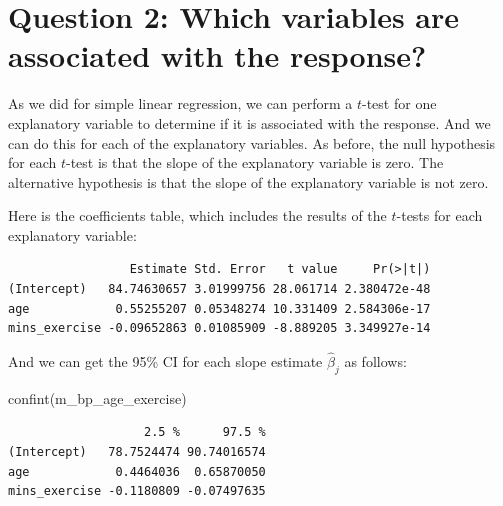 \documentclass[
  letterpaper,
  8pt,
  a4paper]{book}
\newenvironment{Shaded}{\begin{snugshade}}{\end{snugshade}}
\newcommand{\FunctionTok}[1]{\textcolor[rgb]{0.28,0.35,0.67}{#1}}
\newcommand{\NormalTok}[1]{\textcolor[rgb]{0.00,0.23,0.31}{#1}}
\newcommand{\SpecialCharTok}[1]{\textcolor[rgb]{0.37,0.37,0.37}{#1}}
\begin{document}
\section*{Question 2: Which variables are associated with the
response?}\label{question-2-which-variables-are-associated-with-the-response}


As we did for simple linear regression, we can perform a \(t\)-test for
one explanatory variable to determine if it is associated with the
response. And we can do this for each of the explanatory variables. As
before, the null hypothesis for each \(t\)-test is that the slope of the
explanatory variable is zero. The alternative hypothesis is that the
slope of the explanatory variable is not zero.

Here is the coefficients table, which includes the results of the
\(t\)-tests for each explanatory variable:

\begin{Shaded}
\end{Shaded}

\begin{verbatim}
                 Estimate Std. Error   t value     Pr(>|t|)
(Intercept)   84.74630657 3.01999756 28.061714 2.380472e-48
age            0.55255207 0.05348274 10.331409 2.584306e-17
mins_exercise -0.09652863 0.01085909 -8.889205 3.349927e-14
\end{verbatim}

And we can get the 95\% CI for each slope estimate \(\hat\beta_j\) as
follows:

\begin{Shaded}
\begin{Highlighting}[]
\FunctionTok{confint}\NormalTok{(m\_bp\_age\_exercise)}
\end{Highlighting}
\end{Shaded}

\begin{verbatim}
                   2.5 %      97.5 %
(Intercept)   78.7524474 90.74016574
age            0.4464036  0.65870050
mins_exercise -0.1180809 -0.07497635
\end{verbatim}
\end{document}
